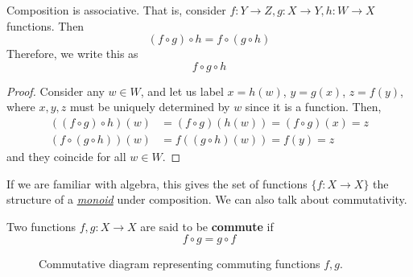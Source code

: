  \begin{theorem}[Associativity]
		\label{thm:func_assoc}
    Composition is associative. That is, consider $f: Y \rightarrow Z, g: X \rightarrow Y, h: W \rightarrow X$ functions. Then 
    \begin{equation}
      (f \circ g) \circ h = f \circ (g \circ h)
    \end{equation} 
    Therefore, we write this as 
    \begin{equation}
      f \circ g \circ h
    \end{equation} 
    \begin{figure}[H]
      \centering 
      \caption{} 
      \label{fig:associative}
    \end{figure}
  \end{theorem}
  \begin{proof}
    Consider any $w \in W$, and let us label $x = h(w)$, $y = g(x)$, $z = f(y)$, where $x, y, z$ must be uniquely determined by $w$ since it is a function. Then, 
    \begin{align}
      ((f \circ g) \circ h) (w) & = (f \circ g) (h(w)) = (f \circ g) (x) = z  \\
      (f \circ (g \circ h)) (w) & = f ((g \circ h)(w)) = f (y) = z
    \end{align}
    and they coincide for all $w \in W$. 
  \end{proof} 

  If we are familiar with algebra, this gives the set of functions $\{f: X \rightarrow X\}$ the structure of a \textit{\hyperref[alg-def:monoid]{monoid}} under composition. We can also talk about commutativity. 

  \begin{definition}[Commutativity]
    \label{def:commutativity}
    Two functions $f, g: X \rightarrow X$ are said to be \textbf{commute} if 
    \begin{equation}
      f \circ g = g \circ f
    \end{equation} 
    \begin{figure}[H]
      \centering 
      \caption{Commutative diagram representing commuting functions $f, g$. } 
      \label{fig:commutative}
    \end{figure}
  \end{definition}

